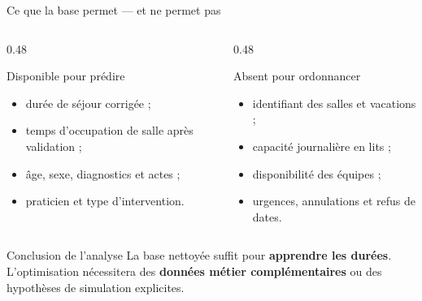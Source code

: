 \begin{frame}{Ce que la base permet --- et ne permet pas}
  \begin{columns}[T]
    \begin{column}{0.48\textwidth}
      \begin{exampleblock}{Disponible pour prédire}
        \small
        \begin{itemize}\itemsep3pt
          \item durée de séjour corrigée ;
          \item temps d'occupation de salle après validation ;
          \item âge, sexe, diagnostics et actes ;
          \item praticien et type d'intervention.
        \end{itemize}
      \end{exampleblock}
    \end{column}
    \begin{column}{0.48\textwidth}
      \begin{alertblock}{Absent pour ordonnancer}
        \small
        \begin{itemize}\itemsep3pt
          \item identifiant des salles et vacations ;
          \item capacité journalière en lits ;
          \item disponibilité des équipes ;
          \item urgences, annulations et refus de dates.
        \end{itemize}
      \end{alertblock}
    \end{column}
  \end{columns}

  \vspace{0.25em}
  \begin{block}{Conclusion de l'analyse}
    \centering
    La base nettoyée suffit pour \textbf{apprendre les durées}.\\
    L'optimisation nécessitera des \textbf{données métier complémentaires}
    ou des hypothèses de simulation explicites.
  \end{block}
\end{frame}
